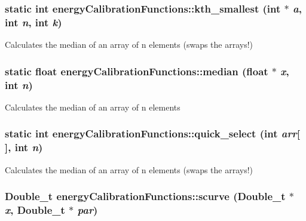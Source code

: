 \subsubsection{\setlength{\rightskip}{0pt plus 5cm}static int energy\-Calibration\-Functions::kth\_\-smallest (int $\ast$ {\em a}, int {\em n}, int {\em k})\hspace{0.3cm}{\tt  [static]}}\label{classenergyCalibrationFunctions_7d9a7b8d0c8ff69638a5fbb9f4c04b90}


Calculates the median of an array of n elements (swaps the arrays!) 
\subsubsection{\setlength{\rightskip}{0pt plus 5cm}static float energy\-Calibration\-Functions::median (float $\ast$ {\em x}, int {\em n})\hspace{0.3cm}{\tt  [static]}}\label{classenergyCalibrationFunctions_37f557bacb75213073c8d421cc1240f4}


Calculates the median of an array of n elements 
\subsubsection{\setlength{\rightskip}{0pt plus 5cm}static int energy\-Calibration\-Functions::quick\_\-select (int {\em arr}[$\,$], int {\em n})\hspace{0.3cm}{\tt  [static]}}\label{classenergyCalibrationFunctions_a3ab0e7c3c862fb51dfda78f1b09a55c}


Calculates the median of an array of n elements (swaps the arrays!) 
\subsubsection{\setlength{\rightskip}{0pt plus 5cm}Double\_\-t energy\-Calibration\-Functions::scurve (Double\_\-t $\ast$ {\em x}, Double\_\-t $\ast$ {\em par})}\label{classenergyCalibrationFunctions_e220482622e88a46b12498b0e4d8113a}



